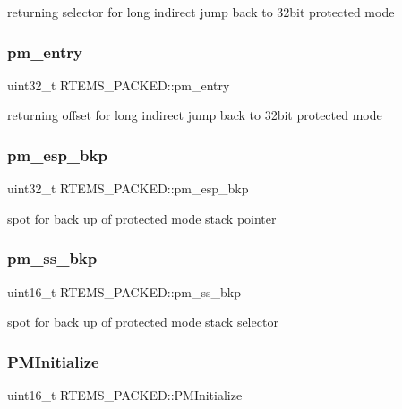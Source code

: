 returning selector for long indirect jump back to 32bit protected mode \mbox{\label{structRTEMS__PACKED_a18b4b03991d0ebfcac4255084745bca1}} 
\subsubsection{\texorpdfstring{pm\_entry}{pm\_entry}}
{\footnotesize\ttfamily uint32\+\_\+t R\+T\+E\+M\+S\+\_\+\+P\+A\+C\+K\+E\+D\+::pm\+\_\+entry}

returning offset for long indirect jump back to 32bit protected mode \mbox{\label{structRTEMS__PACKED_a805aa4788df5a9664fb97711e900846f}} 
\subsubsection{\texorpdfstring{pm\_esp\_bkp}{pm\_esp\_bkp}}
{\footnotesize\ttfamily uint32\+\_\+t R\+T\+E\+M\+S\+\_\+\+P\+A\+C\+K\+E\+D\+::pm\+\_\+esp\+\_\+bkp}

spot for back up of protected mode stack pointer \mbox{\label{structRTEMS__PACKED_a01d0a07eb15cc3e69eaf08bf6af2cbf6}} 
\subsubsection{\texorpdfstring{pm\_ss\_bkp}{pm\_ss\_bkp}}
{\footnotesize\ttfamily uint16\+\_\+t R\+T\+E\+M\+S\+\_\+\+P\+A\+C\+K\+E\+D\+::pm\+\_\+ss\+\_\+bkp}

spot for back up of protected mode stack selector \mbox{\label{structRTEMS__PACKED_a6355cfdc25353c0836a55e7c788eb515}} 
\subsubsection{\texorpdfstring{PMInitialize}{PMInitialize}}
{\footnotesize\ttfamily uint16\+\_\+t R\+T\+E\+M\+S\+\_\+\+P\+A\+C\+K\+E\+D\+::\+P\+M\+Initialize}

